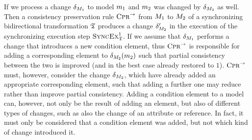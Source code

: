 If we process a change $\delta_{M_{1}}$ to model $m_{1}$ and $m_{2}$ was changed by $\delta_{M_{2}}$ as well.
Then a consistency preservation rule $\textsc{Cpr}_{}^{\rightarrow}$ from $M_{1}$ to $M_{2}$ of a synchronizing bidirectional transformation $\mathfrak{T}$ produces a change $\delta_{M_{2}}'$ in the execution of the synchronizing execution step $\textsc{SyncEx}_{\mathfrak{T}}^1$.
If we assume that $\delta_{M_{1}}$ performs a change that introduces a new condition element, thus $\textsc{Cpr}_{}^{\rightarrow}$ is responsible for adding a corresponding element to $\delta_{M_{2}}(m_{2})$ such that partial consistency between the two is improved (and in the best case already restored to $1$).
$\textsc{Cpr}_{}^{\rightarrow}$ must, however, consider the change $\delta_{M_{2}}$, which have already added an appropriate corresponding element, such that adding a further one may reduce rather than improve partial consistency.
Adding a condition element to a model can, however, not only be the result of adding an element, but also of different types of changes, such as also the change of an attribute or reference.
In fact, it must only be considered that a condition element was added, but not which kind of change introduced it.



